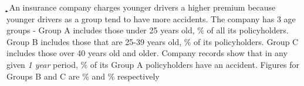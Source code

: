 


\FRACADD{}\a\b
{}\a\b\c\d

\question 
An insurance company charges younger drivers a higher premium because younger drivers 
as a group tend to have more accidents. The company has 3 age groups - Group A includes those
under 25 years old, \vbone\% of all its policyholders. Group B includes those that are 25-39 years
old,  \vbtwo\% of its policyholders. Group C includes those over 40 years old and older. Company 
records show that in any given \textit{1 year} period, \vbthree\% of its Group A policyholders have 
an accident. Figures for Groups B and C are \vbfour\% and \vbfive\% respectively

\watchout[-80pt]

\ifprintanswers
\fi 

